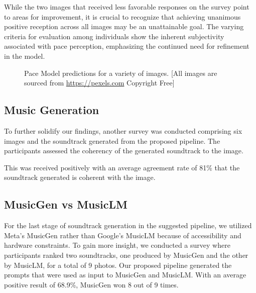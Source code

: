 \documentclass[conference]{IEEEtran}
\begin{document}
While the two images that received less favorable responses on the survey point to areas for improvement, it is crucial to recognize that achieving unanimous positive reception across all images may be an unattainable goal. The varying criteria for evaluation among individuals show the inherent subjectivity associated with pace perception, emphasizing the continued need for refinement in the model.

\begin{figure}[ht]
    \centering
    \caption{Pace Model predictions for a variety of images. [All images are sourced from \url{https://pexels.com} Copyright Free]}
    \label{fig:pace-model-predictions}
\end{figure}

\subsection*{Music Generation}

To further solidify our findings, another survey was conducted comprising six images and the soundtrack generated from the proposed pipeline. The participants assessed the coherency of the generated soundtrack to the image.

This was received positively with an average agreement rate of 81\% that the soundtrack generated is coherent with the image.

\subsection*{MusicGen vs MusicLM}

For the last stage of soundtrack generation in the suggested pipeline, we utilized Meta's MusicGen rather than Google's MusicLM because of accessibility and hardware constraints. To gain more insight, we conducted a survey where participants ranked two soundtracks, one produced by MusicGen and the other by MusicLM, for a total of 9 photos. Our proposed pipeline generated the prompts that were used as input to MusicGen and MusicLM. With an average positive result of 68.9\%, MusicGen won 8 out of 9 times.
\end{document}
